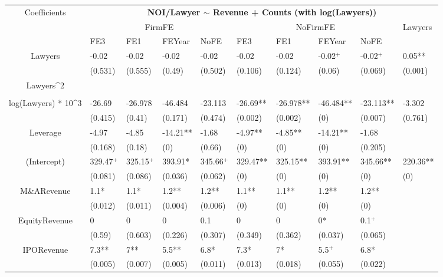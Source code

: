 \documentclass{article}
\begin{document}
\begin{table}[H]
\end{table}


\begin{table}[H]
\centering
\begin{tabular}{|clllllllll|}
\hline
\multirow{3}{*}{Coefficients} & \multicolumn{9}{c|}{\textbf{NOI/Lawyer $\sim$ Revenue + Counts (with log(Lawyers))}} \\
\cline{2-10}
& \multicolumn{4}{c}{FirmFE} & \multicolumn{4}{c}{NoFirmFE} & \multirow{2}{*}{Lawyers} \\
\cline{2-9}
& FE3 & FE1 & FEYear & NoFE & FE3 & FE1 & FEYear & NoFE &  \\
\hline
 
Lawyers & -0.02 & -0.02 & -0.02 & -0.02 & -0.02 & -0.02 & -0.02$^{+}$ & -0.02$^{+}$ & 0.05** \\ 
   & (0.531) & (0.555) & (0.49) & (0.502) & (0.106) & (0.124) & (0.06) & (0.069) & (0.001) \\ 
  Lawyers^2 &  &  &  &  &  &  &  &  &  \\ 
   &  &  &  &  &  &  &  &  &  \\ 
  log(Lawyers) * 10^3 & -26.69 & -26.978 & -46.484 & -23.113 & -26.69** & -26.978** & -46.484** & -23.113** & -3.302 \\ 
   & (0.415) & (0.41) & (0.171) & (0.474) & (0.002) & (0.002) & (0) & (0.007) & (0.761) \\ 
  Leverage & -4.97 & -4.85 & -14.21** & -1.68 & -4.97** & -4.85** & -14.21** & -1.68 &  \\ 
   & (0.168) & (0.18) & (0) & (0.66) & (0) & (0) & (0) & (0.205) &  \\ 
  (Intercept) & 329.47$^{+}$ & 325.15$^{+}$ & 393.91* & 345.66$^{+}$ & 329.47** & 325.15** & 393.91** & 345.66** & 220.36** \\ 
   & (0.081) & (0.086) & (0.036) & (0.062) & (0) & (0) & (0) & (0) & (0) \\ 
  M\&ARevenue & 1.1* & 1.1* & 1.2** & 1.2** & 1.1** & 1.1** & 1.2** & 1.2** &  \\ 
   & (0.012) & (0.011) & (0.004) & (0.006) & (0) & (0) & (0) & (0) &  \\ 
  EquityRevenue & 0 & 0 & 0 & 0.1 & 0 & 0 & 0* & 0.1$^{+}$ &  \\ 
   & (0.59) & (0.603) & (0.226) & (0.307) & (0.349) & (0.362) & (0.037) & (0.065) &  \\ 
  IPORevenue & 7.3** & 7** & 5.5** & 6.8* & 7.3* & 7* & 5.5$^{+}$ & 6.8* &  \\ 
   & (0.005) & (0.007) & (0.005) & (0.011) & (0.013) & (0.018) & (0.055) & (0.022) &  \\ 

\end{tabular}
\end{table}
\end{document}

